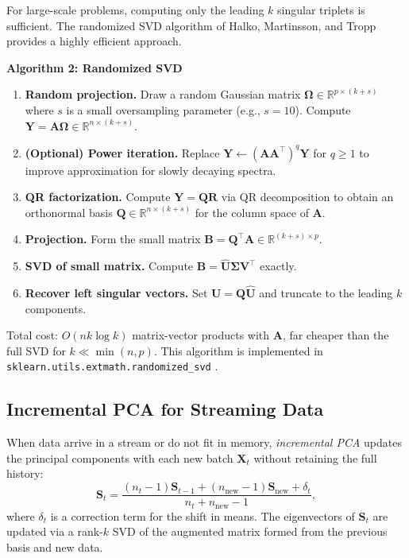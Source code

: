 \documentclass[conference]{IEEEtran}
\begin{document}
For large-scale problems, computing only the leading $k$ singular triplets is sufficient. The randomized SVD algorithm of Halko, Martinsson, and Tropp \cite{halko2011} provides a highly efficient approach.

\textbf{Algorithm 2: Randomized SVD}
\begin{enumerate}
  \item \textbf{Random projection.} Draw a random Gaussian matrix $\mathbf{\Omega} \in \mathbb{R}^{p \times (k+s)}$ where $s$ is a small oversampling parameter (e.g., $s = 10$). Compute $\mathbf{Y} = \mathbf{A}\mathbf{\Omega} \in \mathbb{R}^{n \times (k+s)}$.
  \item \textbf{(Optional) Power iteration.} Replace $\mathbf{Y} \leftarrow (\mathbf{A}\mathbf{A}^\top)^q \mathbf{Y}$ for $q \geq 1$ to improve approximation for slowly decaying spectra.
  \item \textbf{QR factorization.} Compute $\mathbf{Y} = \mathbf{Q}\mathbf{R}$ via QR decomposition to obtain an orthonormal basis $\mathbf{Q} \in \mathbb{R}^{n \times (k+s)}$ for the column space of $\mathbf{A}$.
  \item \textbf{Projection.} Form the small matrix $\mathbf{B} = \mathbf{Q}^\top\mathbf{A} \in \mathbb{R}^{(k+s) \times p}$.
  \item \textbf{SVD of small matrix.} Compute $\mathbf{B} = \hat{\mathbf{U}}\mathbf{\Sigma}\mathbf{V}^\top$ exactly.
  \item \textbf{Recover left singular vectors.} Set $\mathbf{U} = \mathbf{Q}\hat{\mathbf{U}}$ and truncate to the leading $k$ components.
\end{enumerate}
Total cost: $O(nk\log k)$ matrix-vector products with $\mathbf{A}$, far cheaper than the full SVD for $k \ll \min(n,p)$. This algorithm is implemented in \texttt{sklearn.utils.extmath.randomized\_svd} \cite{pedregosa2011}.

\subsection{Incremental PCA for Streaming Data}

When data arrive in a stream or do not fit in memory, \emph{incremental PCA} \cite{ross2008} updates the principal components with each new batch $\mathbf{X}_t$ without retaining the full history:
\begin{equation}
\mathbf{S}_{t} = \frac{(n_t - 1)\mathbf{S}_{t-1} + (n_{\text{new}} - 1)\mathbf{S}_{\text{new}} + \delta_t}{n_t + n_{\text{new}} - 1},
\end{equation}
where $\delta_t$ is a correction term for the shift in means. The eigenvectors of $\mathbf{S}_t$ are updated via a rank-$k$ SVD of the augmented matrix formed from the previous basis and new data.
\end{document}
